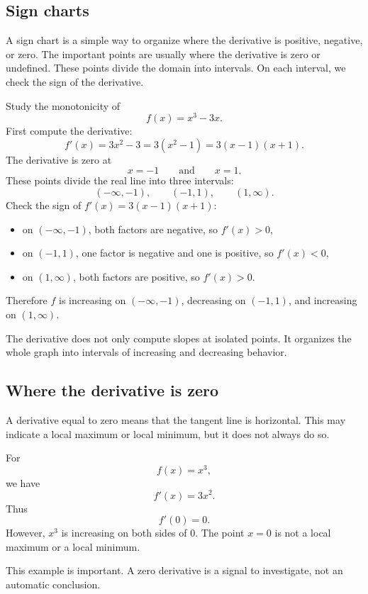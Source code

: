 \subsection*{Sign charts}

A sign chart is a simple way to organize where the derivative is positive, negative, or zero. The important points are usually where the derivative is zero or undefined. These points divide the domain into intervals. On each interval, we check the sign of the derivative.

\begin{examplebox}
Study the monotonicity of
\[
f(x)=x^3-3x.
\]
First compute the derivative:
\[
f'(x)=3x^2-3=3(x^2-1)=3(x-1)(x+1).
\]
The derivative is zero at
\[
x=-1
\qquad\text{and}\qquad
x=1.
\]
These points divide the real line into three intervals:
\[
(-\infty,-1),
\qquad
(-1,1),
\qquad
(1,\infty).
\]
Check the sign of \(f'(x)=3(x-1)(x+1)\):
\begin{itemize}
\item on \((-\infty,-1)\), both factors are negative, so \(f'(x)>0\),
\item on \((-1,1)\), one factor is negative and one is positive, so \(f'(x)<0\),
\item on \((1,\infty)\), both factors are positive, so \(f'(x)>0\).
\end{itemize}
Therefore \(f\) is increasing on \((-\infty,-1)\), decreasing on \((-1,1)\), and increasing on \((1,\infty)\).
\end{examplebox}

The derivative does not only compute slopes at isolated points. It organizes the whole graph into intervals of increasing and decreasing behavior.

\subsection*{Where the derivative is zero}

A derivative equal to zero means that the tangent line is horizontal. This may indicate a local maximum or local minimum, but it does not always do so.

\begin{examplebox}
For
\[
f(x)=x^3,
\]
we have
\[
f'(x)=3x^2.
\]
Thus
\[
f'(0)=0.
\]
However, \(x^3\) is increasing on both sides of \(0\). The point \(x=0\) is not a local maximum or a local minimum.
\end{examplebox}

This example is important. A zero derivative is a signal to investigate, not an automatic conclusion.

